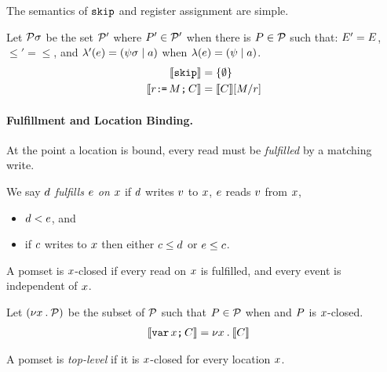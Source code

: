 The semantics of $\texttt{skip}$ and register assignment are simple.
\begin{definition}
Let $\mathcal{P}\sigma$ be the set $\mathcal{P}'$ where $P'\in\mathcal{P}'$ when
there is $P\in\mathcal{P}$ such that:
$E' = E$,
${\le'} = {\le}$, 
and
$\lambda'(e) = (\psi\sigma \mid a)$ when $\lambda(e) = (\psi \mid a)$.
\begin{align*}
  \llbracket\texttt{skip}\rrbracket & =
  \{ \emptyset \}
  \\  
  \llbracket r\texttt{:}\mkern-1mu\texttt{=}\,M\texttt{;}\,\allowbreak C\rrbracket & =
  \llbracket C\rrbracket[M/r] 
\end{align*}
\end{definition}

\paragraph{Fulfillment and Location Binding.}
At the point a location is bound, every read must be \emph{fulfilled} by a
matching write.

\begin{definition}
  \label{def:rf}
  We say $d$ \emph{fulfills $e$ on $x$} if $d$ \externally writes
  $v$ to $x$, $e$ \externally reads $v$ from $x$,
  \begin{itemize}
  \item
    $d < e$, and
  \item
    if $c$ \externally writes to $x$ then either $c \leq d$ or $e \leq c$.
  \end{itemize}

  A pomset is $x$-closed if every \external read on $x$ is fulfilled,
  and every event is independent of $x$.

  Let $(\nu x\mathbin.\mathcal{P})$ be the subset of $\mathcal{P}$ such that $P\in\mathcal{P}$
  when and $P$ is $x$-closed.
\begin{align*}
  \llbracket\texttt{var}\,x\texttt{;}\,\allowbreak C\rrbracket & =
  \nu x \mathbin. \llbracket C\rrbracket  
\end{align*}

  A pomset is \emph{top-level} if it is $x$-closed for every location $x$.
\end{definition}

